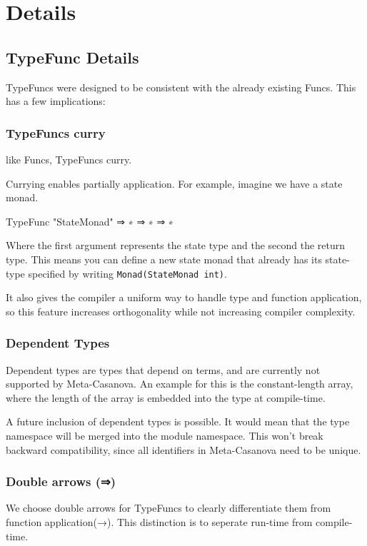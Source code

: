 \section{Details}


\subsection{TypeFunc Details}
TypeFuncs were designed to be consistent with the already existing Funcs.
This has a few implications:

\subsubsection*{TypeFuncs curry}
like Funcs, TypeFuncs curry.

Currying enables partially application.
For example, imagine we have a state monad.

\begin{code}
  TypeFunc "StateMonad" ⇒ ∗ ⇒ ∗ ⇒ ∗
\end{code}

\noindent Where the first argument represents the state type and the second the return type.
This means you can define a new state monad that already has its state-type specified by writing \verb|Monad(StateMonad int)|.

It also gives the compiler a uniform way to handle type and function application,
so this feature increases orthogonality while not increasing compiler complexity.

\subsubsection*{Dependent Types}
Dependent types are types that depend on terms, and are currently not supported by Meta-Casanova.
An example for this is the constant-length array, where the length of the array is embedded into the type at compile-time.

A future inclusion of dependent types is possible.
It would mean that the type namespace will be merged into the module namespace.
This won't break backward compatibility, since all identifiers in Meta-Casanova need to be unique.

\subsubsection*{Double arrows (⇒)}
We choose double arrows for TypeFuncs to clearly differentiate them from function application(→).
This distinction is to seperate run-time from compile-time.


